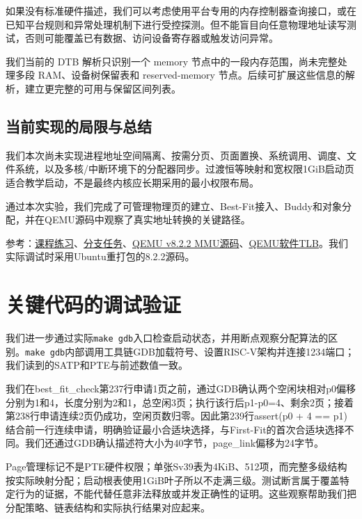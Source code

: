 \documentclass[UTF8,a4paper,10pt]{ctexart}
\begin{document}
如果没有标准硬件描述，我们可以考虑使用平台专用的内存控制器查询接口，或在已知平台规则和异常处理机制下进行受控探测。但不能盲目向任意物理地址读写测试，否则可能覆盖已有数据、访问设备寄存器或触发访问异常。


我们当前的 DTB 解析只识别一个 memory 节点中的一段内存范围，尚未完整处理多段 RAM、设备树保留表和 reserved-memory 节点。后续可扩展这些信息的解析，建立更完整的可用与保留区间列表。


\subsection{当前实现的局限与总结}

我们本次尚未实现进程地址空间隔离、按需分页、页面置换、系统调用、调度、文件系统，以及多核/中断环境下的分配器同步。过渡恒等映射和宽权限1GiB启动页适合教学启动，不是最终内核应长期采用的最小权限布局。


通过本次实验，我们完成了可管理物理页的建立、Best-Fit接入、Buddy和对象分配，并在QEMU源码中观察了真实地址转换的关键路径。


参考：\href{http://8.135.34.58/lab2026/_book/lab2/lab2_2_1_exercise.html}{课程练习}、\href{http://8.135.34.58/lab2026/_book/lab2/lab2_4_qemu_mmu_debug.html}{分支任务}、\href{https://github.com/qemu/qemu/blob/v8.2.2/target/riscv/cpu_helper.c}{QEMU v8.2.2 MMU源码}、\href{https://github.com/qemu/qemu/blob/v8.2.2/accel/tcg/cputlb.c}{QEMU软件TLB}。我们实际调试时采用Ubuntu重打包的8.2.2源码。


\section{关键代码的调试验证}

我们进一步通过实际\nolinkurl{make gdb}入口检查启动状态，并用断点观察分配算法的区别。\nolinkurl{make gdb}内部调用工具链GDB加载符号、设置RISC-V架构并连接1234端口；我们读到的SATP和PTE与前述数值一致。


我们在best\_fit\_check第237行申请1页之前，通过GDB确认两个空闲块相对p0偏移分别为1和4，长度分别为2和1，总空闲3页；执行该行后p1-p0=4、剩余2页；接着第238行申请连续2页仍成功，空闲页数归零。因此第239行assert(p0 + 4 == p1)结合前一行连续申请，明确验证最小合适块选择，与First-Fit的首次合适块选择不同。我们还通过GDB确认描述符大小为40字节，page\_link偏移为24字节。


Page管理标记不是PTE硬件权限；单张Sv39表为4KiB、512项，而完整多级结构按实际映射分配；启动根表使用1GiB叶子所以不走满三级。测试断言属于覆盖特定行为的证据，不能代替任意非法释放或并发正确性的证明。这些观察帮助我们把分配策略、链表结构和实际执行结果对应起来。
\end{document}
